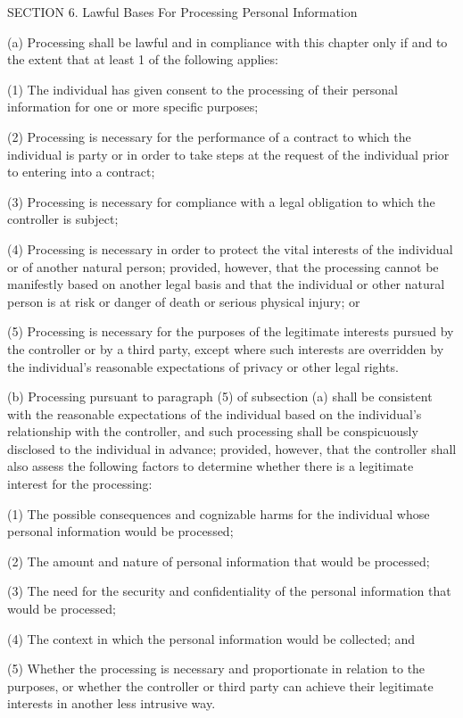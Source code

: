 SECTION 6. Lawful Bases For Processing Personal Information

(a) Processing shall be lawful and in compliance with this chapter only if and to the extent that at least 1 of the following applies:

(1) The individual has given consent to the processing of their personal information for one or more specific purposes;

(2) Processing is necessary for the performance of a contract to which the individual is party or in order to take steps at the request of the individual prior to entering into a contract;

(3) Processing is necessary for compliance with a legal obligation to which the controller is subject;

(4) Processing is necessary in order to protect the vital interests of the individual or of another natural person; provided, however, that the processing cannot be manifestly based on another legal basis and that the individual or other natural person is at risk or danger of death or serious physical injury; or

(5) Processing is necessary for the purposes of the legitimate interests pursued by the controller or by a third party, except where such interests are overridden by the individual’s reasonable expectations of privacy or other legal rights. 

(b) Processing pursuant to paragraph (5) of subsection (a) shall be consistent with the reasonable expectations of the individual based on the individual’s relationship with the controller, and such processing shall be conspicuously disclosed to the individual in advance; provided, however, that the controller shall also assess the following factors to determine whether there is a legitimate interest for the processing:

(1) The possible consequences and cognizable harms for the individual whose personal information would be processed;

(2) The amount and nature of personal information that would be processed;

(3) The need for the security and confidentiality of the personal information that would be processed;

(4) The context in which the personal information would be collected; and

(5) Whether the processing is necessary and proportionate in relation to the purposes, or whether the controller or third party can achieve their legitimate interests in another less intrusive way.

